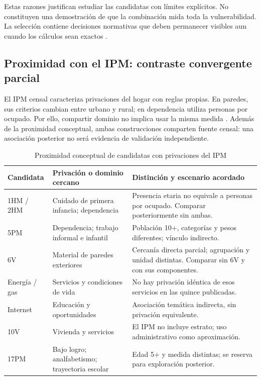 Estas razones justifican estudiar las candidatas con límites explícitos. No constituyen una demostración de que la combinación mida toda la vulnerabilidad. La selección contiene decisiones normativas que deben permanecer visibles aun cuando los cálculos sean exactos \citep{oecd2008composite,alkire2011multidimensional}.

\subsection{Proximidad con el IPM: contraste convergente parcial}

El IPM censal caracteriza privaciones del hogar con reglas propias. En paredes, sus criterios cambian entre urbano y rural; en dependencia utiliza personas por ocupado. Por ello, compartir dominio no implica usar la misma medida \citep{dane2020ipmcensal}. Además de la proximidad conceptual, ambas construcciones comparten fuente censal: una asociación posterior no será evidencia de validación independiente.

\begin{table}[htbp]
\centering\small
\caption{Proximidad conceptual de candidatas con privaciones del IPM}\label{tab:solapamiento_actual}
\begin{tabularx}{\textwidth}{@{}lXX@{}}
\toprule
Candidata & Privación o dominio cercano & Distinción y escenario acordado \\
\midrule
1HM / 2HM & Cuidado de primera infancia; dependencia & Presencia etaria no equivale a personas por ocupado. Comparar posteriormente sin ambas. \\
5PM & Dependencia; trabajo informal e infantil & Población 10+, categorías y pesos diferentes; vínculo indirecto. \\
6V & Material de paredes exteriores & Cercanía directa parcial; agrupación y unidad distintas. Comparar sin 6V y con sus componentes. \\
Energía / gas & Servicios y condiciones de vida & No hay privación idéntica de esos servicios en las quince publicadas. \\
Internet & Educación y oportunidades & Asociación temática indirecta, sin privación equivalente. \\
10V & Vivienda y servicios & El IPM no incluye estrato; uso administrativo como aproximación. \\
17PM & Bajo logro; analfabetismo; trayectoria escolar & Edad 5+ y medida distintas; se reserva para exploración posterior. \\
\bottomrule
\end{tabularx}
\end{table}

